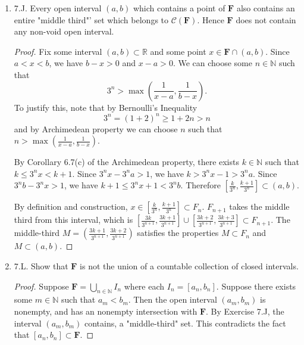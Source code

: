 \begin{enumerate}
\begin{proof}
Next we show that $[\xi, \eta]\supset \bigcap_{n \in N} I_{n}$. Take $x \in \bigcap_{n \in N} I_{n}$. Then $x \in I_n$ for all $n \in \mathbb{N}$. Suppose that $x < \xi$. Then there exists some $m \in \mathbb{N}$ such that $x<a_m \le  \xi$. Clearly $x \in I_m$ is not true, a contradiction. Therefore we must have $x \ge \xi$. By the same reasoning we have $x\le \eta$, so $x \in  \left[ \xi, \eta \right] $.
\end{proof}
	\item 7.J. Every open interval $(a, b)$ which contains a point of $\boldsymbol{F}$ also contains an entire "middle third"' set which belongs to $\mathscr{C}(\boldsymbol{F})$. Hence $\boldsymbol{F}$ does not contain any non-void open interval.
\begin{proof}
	Fix some interval $(a,b) \subset \mathbb{R}$ and some point $x \in \mathbf{F}\cap (a,b)$. Since $a<x<b$, we have $b-x>0$ and $x-a>0$. We can choose some $n \in \mathbb{N}$ such that\[
	3^n > \max(\frac{1}{x-a}, \frac{1}{b-x})
	.\] 
	To justify this, note that by Bernoulli's Inequality\[
	3^n = (1+2)^n \ge  1 + 2n > n
	\]
	and by Archimedean property we can choose $n$ such that  $n> \max(\frac{1}{x-a}, \frac{1}{b-x}) $.

	By Corollary 6.7(c) of the Archimedean property, there exists $k \in \mathbb{N}$ such that $k \le  3^n x < k+1$. Since $3^n x - 3^n a > 1$, we have $k > 3^n x -1 > 3^n a$. Since $3^nb - 3^nx > 1$, we have $k+1 \le 3^n x + 1<3^n b$. Therefore $\left[ \frac{k}{3^n}, \frac{k+1}{3^n} \right]  \subset  \left( a,b \right) $.

	By definition and construction, $x \in \left[ \frac{k}{3^n}, \frac{k+1}{3^n} \right] \subset F_n$. $F_{n+1}$ takes the middle third from this interval, which is $\left[ \frac{3k}{3^{n+1}}, \frac{3k+1}{3^{n+1}} \right]\cup \left[ \frac{3k+2}{3^{n+1}}, \frac{3k+3}{3^{n+1}} \right] \subset F_{n+1}$. The middle-third $M = \left(  \frac{3k+1}{3^{n+1}}, \frac{3k+2}{3^{n+1}}  \right)$ satisfies the properties $M \subset F_n $ and $M \subset (a,b)$.
\end{proof}

	\item 7.L. Show that $\boldsymbol{F}$ is not the union of a countable collection of closed intervals.
\begin{proof}
	Suppose $\mathbf{F} = \bigcup_{n \in \mathbb{N}} I_n$ where each $I_n = [a_n, b_n]$. Suppose there exists some $m \in \mathbb{N}$ such that $a_m < b_m$. Then the open interval $(a_m, b_m)$ is nonempty, and has an nonempty intersection with $\mathbf{F}$. By Exercise 7.J, the interval $(a_m, b_m)$ contains, a "middle-third" set. This contradicts the fact that $[a_n, b_n] \subset  \mathbf{F}$. 


\end{proof}
\end{enumerate}

